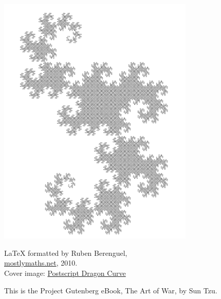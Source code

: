 

\thispagestyle{empty}
\begin{center} 
  {
    \MakeUppercase{\fontsize{1cm}{1cm}\selectfont{The
        Art of War}
    }}\\
  \vspace*{1em}
  {
    \color{darkgray}\MakeUppercase{\fontsize{0.5cm}{0.5cm}\selectfont{Sun Tzu}
    }}
\end{center}
  \begin{center}
    \includegraphics[width=0.7\textwidth]{Dragon.jpg}
  \end{center}

\newpage
\vspace*{3cm}
\newpage
\color{black}
\thispagestyle{empty}
\begin{center}
  LaTeX formatted by Ruben Berenguel,\\
  \href{http://www.mostlymaths.net}{mostlymaths.net}, 2010.\\
  Cover image: \href{http://www.mostlymaths.net/2008/12/quick-postscript-programming-tutorial.html}{Postscript Dragon Curve}
\end{center}
\vspace*{1em}
{This is the Project Gutenberg eBook, The Art of War, by Sun
  Tzu.} 

